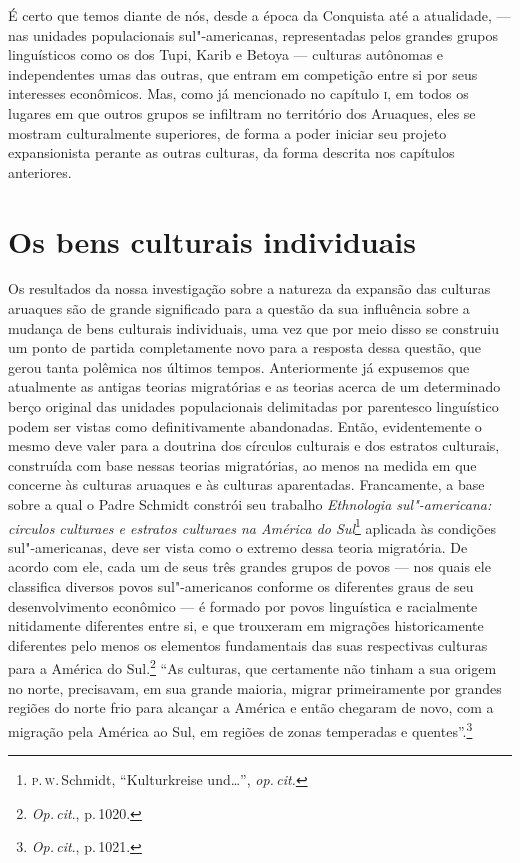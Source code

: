É certo que temos diante de nós, desde a época da Conquista até a atualidade,
--- nas unidades populacionais sul"-americanas, representadas pelos
grandes grupos linguísticos como os dos Tupi, Karib e Betoya --- culturas
autônomas e independentes umas das outras, que entram em competição
entre si por seus interesses econômicos. Mas,
como já mencionado no capítulo \textsc{i}, em todos os lugares em que outros
grupos se infiltram no território dos Aruaques, eles se mostram
culturalmente superiores, de forma a poder iniciar seu projeto
expansionista perante as outras culturas, da forma descrita nos
capítulos anteriores.

\chapter*{Os bens culturais individuais\smallskip{}}


Os resultados da nossa investigação sobre a natureza da expansão das
culturas aruaques são de grande significado para a questão da sua
influência sobre a mudança de bens culturais individuais, uma vez que
por meio disso se construiu um ponto de partida completamente novo para
a resposta dessa questão, que gerou tanta polêmica nos últimos tempos.
Anteriormente já expusemos que atualmente as antigas teorias migratórias
e as teorias acerca de um determinado berço original das unidades
populacionais delimitadas por parentesco linguístico podem ser vistas
como definitivamente abandonadas. Então, evidentemente o mesmo deve
valer para a doutrina dos círculos culturais e dos estratos culturais,
construída com base nessas teorias migratórias, ao menos na medida em
que concerne às culturas aruaques e às culturas aparentadas. Francamente,
a base sobre a qual o Padre Schmidt constrói seu trabalho \textit{Ethnologia sul"-americana: circulos
  culturaes e estratos culturaes na América do Sul}\footnote{\textsc{p}.\,\textsc{w}.\,Schmidt, ``Kulturkreise und\ldots'', \textit{op.\,cit.}} aplicada às condições sul"-americanas, deve ser vista como
o extremo dessa teoria migratória. De acordo com ele, cada um de seus
três grandes grupos de povos --- nos quais ele classifica diversos povos
sul"-americanos conforme os diferentes graus de seu desenvolvimento
econômico --- é formado por povos linguística e racialmente nitidamente
diferentes entre si, e que trouxeram em migrações historicamente
diferentes pelo menos os elementos fundamentais das suas respectivas
culturas para a América do Sul.\footnote{\textit{Op.\,cit}., p.\,1020.} ``As
culturas, que certamente não tinham a sua origem no norte, precisavam,
em sua grande maioria, migrar primeiramente por grandes regiões do
norte frio para alcançar a América e então chegaram de novo, com a
migração pela América ao Sul, em regiões de zonas temperadas e
quentes''.\footnote{\textit{Op.\,cit}., p.\,1021.}

